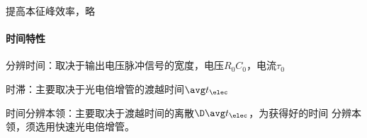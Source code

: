 提高本征峰效率，略
\paragraph{时间特性}
\begin{compactitem}
	\item 分辨时间：取决于输出电压脉冲信号的宽度，电压$R_0C_0$，电流$\tau_0$
	\item 时滞：主要取决于光电倍增管的渡越时间$\avg t_\elec$
	\item 时间分辨本领：主要取决于渡越时间的离散$\D\avg t_\elec$，为获得好的时间	分辨本领，须选用快速光电倍增管。
\end{compactitem}



